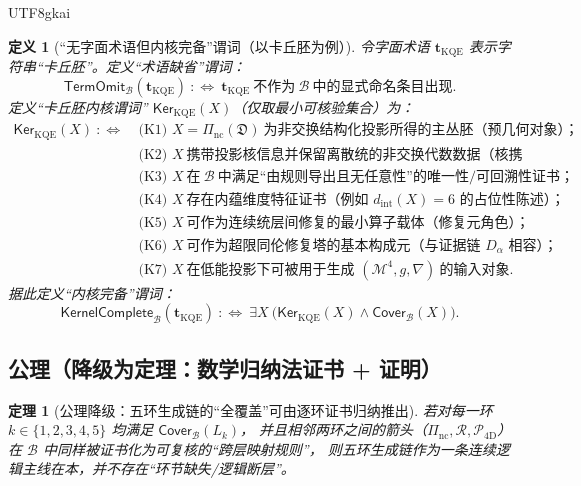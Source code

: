 \documentclass[12pt]{article}
\newtheorem{definition}{定义}[section]
\newtheorem{theorem}{定理}[section]
\newcommand{\KouJing}{\texorpdfstring{表述约定}{表述约定}}
\begin{document}
\begin{CJK*}{UTF8}{gkai}
\begin{definition}[“无字面术语但内核完备”谓词（以卡丘胚为例）]
\label{def:tex29-books-kqemb-kernel}
令字面术语 $\mathbf{t}_{\mathrm{KQE}}$ 表示字符串“卡丘胚”。定义“术语缺省”谓词：
\[
  \mathsf{TermOmit}_{\mathcal{B}}(\mathbf{t}_{\mathrm{KQE}})\ :\Longleftrightarrow\ \mathbf{t}_{\mathrm{KQE}}\ \text{不作为}
    \ \mathcal{B}\ \text{中的显式命名条目出现}.
\]
定义“卡丘胚内核谓词” $\mathsf{Ker}_{\mathrm{KQE}}(X)$（仅取最小可核验集合）为：
\[
\begin{aligned}
  \mathsf{Ker}_{\mathrm{KQE}}(X)\ :\Longleftrightarrow\
  &\text{(K1) }X=\Pi_{\mathrm{nc}}(\mathfrak{D})\ \text{为非交换结构化投影所得的主丛胚（预几何对象）；}\\
  &\text{(K2) }X\ \text{携带投影核信息并保留离散统的非交换代数数据（核携带）；}\\
  &\text{(K3) }X\ \text{在}\ \mathcal{B}\ \text{中满足“由规则导出且无任意性”的唯一性/可回溯性证书；}\\
  &\text{(K4) }X\ \text{存在内蕴维度特征证书（例如 }d_{\mathrm{int}}(X)=6\text{ 的占位性陈述）；}\\
  &\text{(K5) }X\ \text{可作为连续统层间修复的最小算子载体（修复元角色）；}\\
  &\text{(K6) }X\ \text{可作为超限同伦修复塔的基本构成元（与证据链 }D_{\alpha}\text{ 相容）；}\\
  &\text{(K7) }X\ \text{在低能投影下可被用于生成 }(\mathcal{M}^{4},g,\nabla)\ \text{的输入对象}.
\end{aligned}
\]
据此定义“内核完备”谓词：
\[
  \mathsf{KernelComplete}_{\mathcal{B}}(\mathbf{t}_{\mathrm{KQE}})\ :\Longleftrightarrow\
  \exists X\ \bigl(\mathsf{Ker}_{\mathrm{KQE}}(X)\wedge \mathsf{Cover}_{\mathcal{B}}(X)\bigr).
\]
\end{definition}

\subsection{公理（降级为定理：数学归纳法证书 + 证明）}
\label{subsec:tex29-books-cover-chain-axiom}

\begin{theorem}[公理降级：五环生成链的“全覆盖”可由逐环证书归纳推出]
\label{thm:tex29-books-cover-chain-induction}
若对每一环 $k\in\{1,2,3,4,5\}$ 均满足 $\mathsf{Cover}_{\mathcal{B}}(L_k)$，
并且相邻两环之间的箭头（$\Pi_{\mathrm{nc}},\mathcal{R},\mathcal{P}_{\mathrm{4D}}$）在 $\mathcal{B}$ 中同样被证书化为可复核的“跨层映射规则”，
则五环生成链作为一条\emph{连续逻辑主线}在本\KouJing下可被完整提炼，并不存在“环节缺失/逻辑断层”。
\end{theorem}


\end{CJK*}
\end{document}
